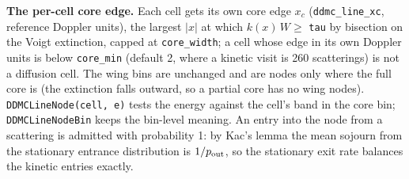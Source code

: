 \documentclass[11pt]{article}
\newcommand{\key}[1]{\texttt{#1}}
\begin{document}
\textbf{The per-cell core edge.}  Each cell gets its own core edge $x_c$
(\texttt{ddmc\_line\_xc}, reference Doppler units), the largest $|x|$ at which
$k(x)\,W \ge$ \key{tau} by bisection on the Voigt extinction, capped at \key{core\_width};
a cell whose edge in its own Doppler units is below \key{core\_min} (default 2, where a
kinetic visit is 260 scatterings) is not a diffusion cell.  The wing bins are unchanged
and are nodes only where the full core is (the extinction falls outward, so a partial
core has no wing nodes).  \texttt{DDMCLineNode(cell, e)} tests the energy against the
cell's band in the core bin; \texttt{DDMCLineNodeBin} keeps the bin-level meaning.  An
entry into the node from a scattering is admitted with probability 1: by Kac's lemma
the mean sojourn from the stationary entrance distribution is $1/p_{\rm out}$, so the
stationary exit rate balances the kinetic entries exactly.
\end{document}
